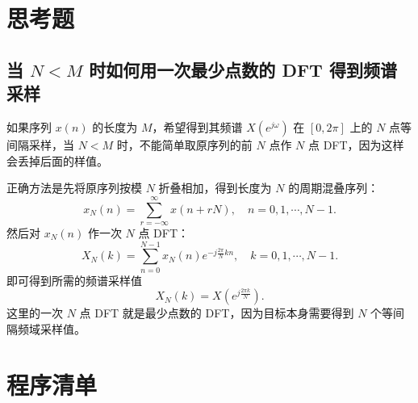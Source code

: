 \documentclass[bachelor,ktreport,openany,oneside,AutoFakeBold=true]{buaathesis}
\begin{document}
\chapter{思考题}

\section{当 \(N<M\) 时如何用一次最少点数的 DFT 得到频谱采样}

如果序列 \(x(n)\) 的长度为 \(M\)，希望得到其频谱 \(X(e^{j\omega})\) 在 \([0,2\pi]\) 上的 \(N\) 点等间隔采样，当 \(N<M\) 时，不能简单取原序列的前 \(N\) 点作 \(N\) 点 DFT，因为这样会丢掉后面的样值。

正确方法是先将原序列按模 \(N\) 折叠相加，得到长度为 \(N\) 的周期混叠序列：
\begin{equation}
x_N(n)=\sum_{r=-\infty}^{\infty}x(n+rN),\quad n=0,1,\cdots,N-1.
\end{equation}
然后对 \(x_N(n)\) 作一次 \(N\) 点 DFT：
\begin{equation}
X_N(k)=\sum_{n=0}^{N-1}x_N(n)e^{-j\frac{2\pi}{N}kn},
\quad k=0,1,\cdots,N-1.
\end{equation}
即可得到所需的频谱采样值
\begin{equation}
X_N(k)=X\left(e^{j\frac{2\pi k}{N}}\right).
\end{equation}
这里的一次 \(N\) 点 DFT 就是最少点数的 DFT，因为目标本身需要得到 \(N\) 个等间隔频域采样值。

\appendix
\chapter{程序清单}


\end{document}
